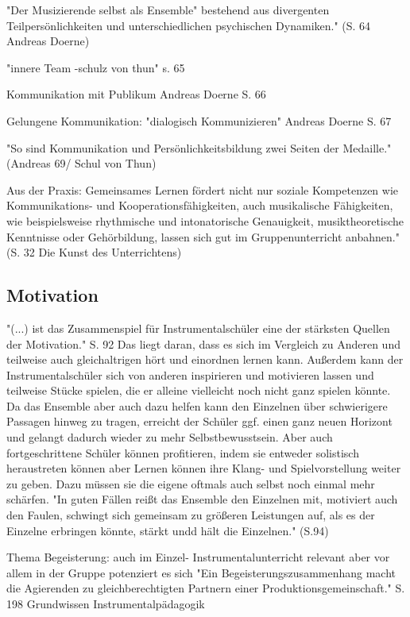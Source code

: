 "Der Musizierende selbst als Ensemble" bestehend aus divergenten Teilpersönlichkeiten und
unterschiedlichen psychischen Dynamiken." (S. 64 Andreas Doerne)

"innere Team -schulz von thun" s. 65

Kommunikation mit Publikum Andreas Doerne S. 66

Gelungene Kommunikation: "dialogisch Kommunizieren" Andreas Doerne S. 67

"So sind Kommunikation und Persönlichkeitsbildung zwei Seiten der Medaille."
(Andreas 69/ Schul von Thun)



Aus der Praxis:
Gemeinsames Lernen fördert nicht nur soziale Kompetenzen wie Kommunikations- und
Kooperationsfähigkeiten, auch musikalische Fähigkeiten, wie beispielsweise
rhythmische und intonatorische Genauigkeit, musiktheoretische Kenntnisse oder
Gehörbildung, lassen sich gut im Gruppenunterricht anbahnen." (S. 32 Die Kunst
des Unterrichtens)


\subsection{Motivation}
"(...) ist das Zusammenspiel für Instrumentalschüler eine der stärksten Quellen
der Motivation." S. 92 Das liegt daran, dass es sich im Vergleich zu Anderen und
teilweise auch gleichaltrigen hört und einordnen lernen kann. Außerdem kann der Instrumentalschüler
sich von anderen inspirieren und motivieren lassen und teilweise Stücke spielen,
die er alleine vielleicht noch nicht ganz spielen könnte. Da das Ensemble aber
auch dazu helfen kann den Einzelnen über schwierigere Passagen hinweg zu tragen,
erreicht der Schüler ggf. einen ganz neuen Horizont und gelangt dadurch wieder
zu mehr Selbstbewusstsein. Aber auch fortgeschrittene Schüler können
profitieren, indem sie entweder solistisch heraustreten können aber Lernen
können ihre Klang- und Spielvorstellung weiter zu geben. Dazu müssen sie die
eigene oftmals auch selbst noch einmal mehr schärfen. "In guten Fällen reißt das
Ensemble den Einzelnen mit, motiviert auch den Faulen, schwingt sich gemeinsam
zu größeren Leistungen auf, als es der Einzelne erbringen könnte, stärkt undd
hält die Einzelnen." (S.94)

Thema Begeisterung: auch im Einzel- Instrumentalunterricht relevant aber vor allem in der Gruppe potenziert es
sich "Ein Begeisterungszusammenhang macht die Agierenden zu gleichberechtigten
Partnern einer Produktionsgemeinschaft." S. 198 Grundwissen
Instrumentalpädagogik


